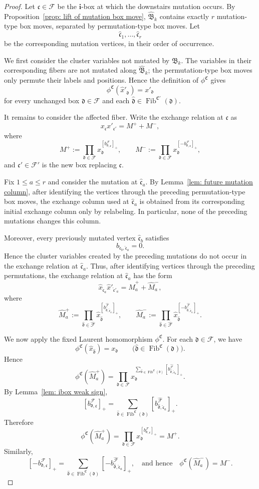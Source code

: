 \documentclass[12pt, leqno]{amsart}
\numberwithin{equation}{section}
\theoremstyle{plain}
\theoremstyle{definition}
\renewcommand{\le}{\leqslant}
\newcommand{\seteq}{\mathbin{:=}}
\newcommand{\Fib}{\operatorname{Fib}}
\newcommand{\hM}{\widehat{M}}
\newcommand{\hx}{\widehat{x}}
\newcommand{\frakB}{\mathfrak{B}}
\newcommand{\frakC}{\mathfrak{C}}
\newcommand{\frakc}{\mathfrak{c}}
\newcommand{\frakd}{\mathfrak{d}}
\newcommand{\hfrakc}{\widehat{\frakc}}
\newcommand{\hfrakd}{\widehat{\frakd}}
\newcommand{\bfi}{\mathbf{i}}
\newcommand{\calF}{\mathcal{F}}
\newcommand{\hcalF}{{\widehat{\calF}}}
\newcommand{\hfrakB}{\widehat{\frakB}}
\newcommand{\qtqh}[1][{and hence}]{\quad\text{{#1}}\quad}
\begin{document}
\begin{proof}
Let $\frakc\in\calF$ be the $\bfi$-box at which the downstairs
mutation occurs. By Proposition~\ref{prop: lift of mutation box move},
 $\hfrakB_k$ contains exactly $r$ mutation-type box moves,
separated by permutation-type box moves. Let
\[
\hfrakc_1,\ldots,\hfrakc_r
\]
be the corresponding mutation vertices, in their order of occurrence.

 We first consider the cluster variables not mutated by $\frakB_k$.
The variables in their corresponding fibers are not mutated along
$\hfrakB_k$; 
the permutation-type box moves only permute their
labels and positions.  Hence the definition of $\phi^\frakC$ gives{}
\[
\phi^\frakC(\hx'_{\hfrakd})=x'_{\frakd}
\]
for  every unchanged box $\frakd\in\calF$  and each
$\hfrakd\in\Fib^{\frakC'}(\frakd)$.

It remains to consider the affected fiber. Write  the exchange relation at $\frakc$  as
\[
x_\frakc x'_{\frakc'} = M^+ + M^-,
\]
where
\[
M^+ \seteq \prod_{\frakd\in\calF} x_\frakd^{[b^\calF_{\frakd,\frakc}]_+},
\qquad
M^- \seteq \prod_{\frakd\in\calF} x_\frakd^{[-b^\calF_{\frakd,\frakc}]_+},
\]
and $\frakc'\in\calF'$ is the new box replacing $\frakc$.

Fix $1\le a\le r$ and consider the mutation at $\hfrakc_a$.
By Lemma~\ref{lem: future mutation column}, after identifying the
vertices through the preceding permutation-type box moves, the
exchange column used at $\hfrakc_a$ is obtained from its corresponding
initial exchange column only by relabeling. In particular, none of
the preceding mutations changes this column.

Moreover, every previously mutated vertex $\hfrakc_b$ satisfies
\[
b_{\hfrakc_b,\hfrakc_a}=0.
\]
Hence the cluster variables created by the preceding mutations do not
occur in the exchange relation at $\hfrakc_a$. Thus, after identifying
vertices through the preceding permutations, the exchange relation
at $\hfrakc_a$ has the form
\[
\hx_{\hfrakc_a}\hx'_{\hfrakc'_a} = \hM^+_a +\hM^-_a,
\]
where
\[
\hM^+_a \seteq \prod_{\hfrakd\in\hcalF} \hx_{\hfrakd}^{[b^\hcalF_{\hfrakd,\hfrakc_a}]_+},
\qquad
\hM^-_a \seteq \prod_{\hfrakd\in\hcalF} \hx_{\hfrakd}^{[-b^\hcalF_{\hfrakd,\hfrakc_a}]_+}.
\]

We now apply  the fixed Laurent homomorphism $\phi^\frakC$.
For each $\frakd\in\calF$, we have
\[
\phi^\frakC(\hx_{\hfrakd})=x_\frakd \qquad \bigl(\hfrakd\in\Fib^{\frakC}(\frakd) \bigr).
\]
Hence
\[
\phi^\frakC(\hM^+_a) = \prod_{\frakd\in\calF} x_\frakd^{ \sum_{\hfrakd\in\Fib^{\frakC}(\frakd)} [b^\hcalF_{\hfrakd,\hfrakc_a}]_+ }.
\]
By Lemma~\ref{lem: ibox weak sign},
\[
[b^\calF_{\frakd,\frakc}]_+ = \sum_{\hfrakd\in\Fib^{\frakC}(\frakd)} [b^\hcalF_{\hfrakd,\hfrakc_a}]_+.
\]
Therefore
\[
\phi^\frakC(\hM^+_a) = \prod_{\frakd\in\calF} x_\frakd^{[b^\calF_{\frakd,\frakc}]_+} = M^+.
\]
Similarly,
\[
[-b^\calF_{\frakd,\frakc}]_+ = \sum_{\hfrakd\in\Fib^{\frakC}(\frakd)} [-b^\hcalF_{\hfrakd,\hfrakc_a}]_+,
\qtqh
\phi^\frakC(\hM^-_a)=M^-.
\]


\end{proof}
\end{document}
